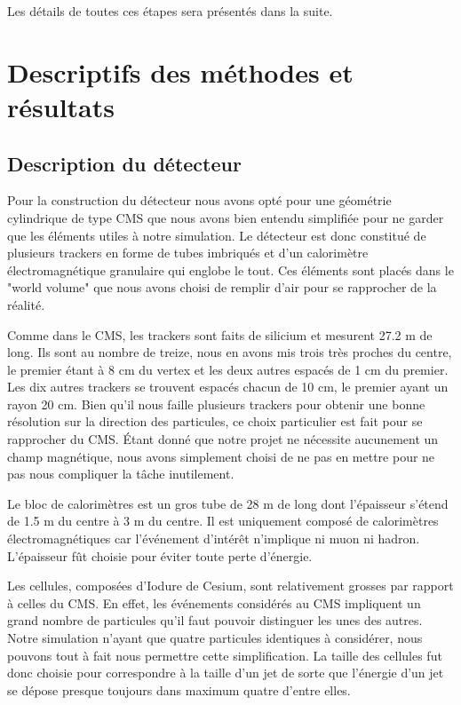 \documentclass[11pt]{article}
\begin{document}
Les d\'etails de toutes ces \'etapes sera pr\'esent\'es dans la suite.





		    \section{Descriptifs des méthodes et résultats}

\subsection{Description du détecteur}

Pour la construction du détecteur nous avons opté pour une géométrie cylindrique
de type CMS que nous avons bien entendu simplifiée pour ne garder que les
éléments utiles à notre simulation. Le détecteur est donc constitué de plusieurs
trackers en forme de tubes imbriqués et d'un calorimètre
électromagnétique granulaire qui englobe le tout. Ces éléments sont placés dans
le "world volume" que nous avons choisi de remplir d'air pour se rapprocher de
la réalité.

Comme dans le CMS, les trackers sont faits de silicium et mesurent 27.2 m de
long. Ils sont au nombre de treize, nous en avons mis trois très proches du
centre, le premier étant à 8 cm du vertex et les deux autres espacés de 1 cm du
premier. Les dix autres trackers se trouvent espacés chacun de 10 cm, le premier
ayant un rayon 20 cm. Bien qu'il nous faille plusieurs trackers pour obtenir
une bonne résolution sur la direction des particules, ce choix particulier est
fait pour se rapprocher du CMS. Étant donné que notre projet ne nécessite
aucunement un champ magnétique, nous avons simplement choisi de ne pas en
mettre pour ne pas nous compliquer la tâche inutilement. 

Le bloc de calorimètres est un gros tube de 28 m de long dont
l'épaisseur s'étend de 1.5 m du centre à 3 m du centre. Il est uniquement
composé de calorimètres électromagnétiques car l'événement d'intérêt n'implique
ni muon ni hadron. L'épaisseur fût choisie pour éviter toute perte d'énergie.

Les cellules, composées d'Iodure de Cesium, sont relativement grosses par
rapport à celles du CMS. En effet, les événements considérés au CMS impliquent
un grand nombre de particules qu'il faut pouvoir distinguer les unes des
autres. Notre simulation n'ayant que quatre particules identiques à considérer,
nous pouvons tout à fait nous permettre cette simplification. La taille des
cellules fut donc choisie pour correspondre à la taille d'un jet de sorte que
l'énergie d'un jet se dépose presque toujours dans maximum quatre d'entre elles.
\end{document}
